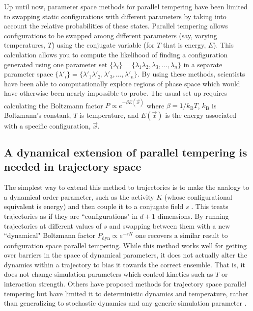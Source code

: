 \documentclass[11pt]{article}
\newcommand{\kB}{k_{\mathrm{B}}}
\begin{document}
Up until now, parameter space methods for parallel tempering \cite{Swendsen1986} have been limited to swapping static configurations with different parameters by taking into account the relative probabilities of these states.  Parallel tempering allows configurations to be swapped among different parameters (say, varying temperatures, $T$) using the conjugate variable (for $T$ that is energy, $E$).  This calculation allows you to compute the likelihood of finding a configuration generated using one parameter set $\{\lambda_{i}\} = \{\lambda_{1} \lambda_{2}, \lambda_{3},...,\lambda_{n}\}$ in a separate parameter space $\{\lambda'_{i}\} = \{\lambda'_{1} \lambda'_{2}, \lambda'_{3},...,\lambda'_{n}\}$.  By using these methods, scientists have been able to computationally explore regions of phase space which would have otherwise been nearly impossible to probe.  The usual set up requires calculating the Boltzmann factor $P \propto e^{-\beta E(\vec{x})}$ where $\beta = 1/\kB T$, $\kB$ is Boltzmann's constant, $T$ is temperature, and $E(\vec{x})$ is the energy associated with a specific configuration, $\vec{x}$.  



\subsection*{A dynamical extension of parallel tempering is needed in trajectory space}

The simplest way to extend this method to trajectories is to make the analogy to a dynamical order parameter, such as the activity $K$  (whose configurational equivalent is energy) and then couple it to a conjugate field $s$ \cite{Garrahan_JPhysA_2008}. This treats trajectories as if they are ``configurations" in $d+1$ dimensions.  By running trajectories at different values of $s$ and swapping between them with a new ``dynamical" Boltzmann factor $P_\mathrm{dyn} \propto e^{-s K}$ one recovers a similar result to configuration space parallel tempering. While this method works well for getting over barriers in the space of dynamical parameters, it does not actually alter the dynamics within a trajectory to bias it towards the correct ensemble.  That is, it does not change simulation parameters which control kinetics such as $T$ or interaction strength. Others have proposed methods for trajectory space parallel tempering but have limited it to deterministic dynamics and temperature, rather than generalizing to stochastic dynamics and any generic simulation parameter \cite{Vlugt2001}.
\end{document}

